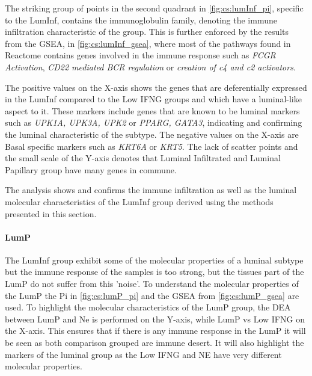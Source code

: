 The striking group of points in the second quadrant in \cref{fig:cs:lumInf_pi}, specific to the LumInf, contains the immunoglobulin family, denoting the immune infiltration characteristic of the group. This is further enforced by the results from the GSEA, in \cref{fig:cs:lumInf_gsea}, where most of the pathways found in Reactome contains genes involved in the immune response such as \textit{FCGR Activation}, \textit{CD22 mediated BCR regulation} or \textit{creation of c4 and c2 activators}.

The positive values on the X-axis shows the genes that are deferentially expressed in the LumInf compared to the Low IFNG groups and which have a luminal-like aspect to it. These markers include genes that are known to be luminal markers such as \textit{UPK1A, UPK3A, UPK2} or \textit{PPARG, GATA3}, indicating and confirming the luminal characteristic of the subtype. The negative values on the X-axis are Basal specific markers such as \textit{KRT6A} or \textit{KRT5}. The lack of scatter points and the small scale of the Y-axis denotes that Luminal Infiltrated and Luminal Papillary group have many genes in commune.

The analysis shows and confirms the immune infiltration as well as the luminal molecular characteristics of the LumInf group derived using the methods presented in this section.

\paragraph*{LumP}


The LumInf group exhibit some of the molecular properties of a luminal subtype but the immune response of the samples is too strong, but the tissues part of the LumP do not suffer from this 'noise'. To understand the molecular properties of the LumP the Pi in \cref{fig:cs:lumP_pi} and the GSEA from \cref{fig:cs:lumP_gsea} are used. To highlight the molecular characteristics of the LumP group, the DEA between LumP and Ne is performed on the Y-axis, while LumP vs Low IFNG on the X-axis. This ensures that if there is any immune response in the LumP it will be seen as both comparison grouped are immune desert. It will also highlight the markers of the luminal group as the Low IFNG and NE have very different molecular properties.

